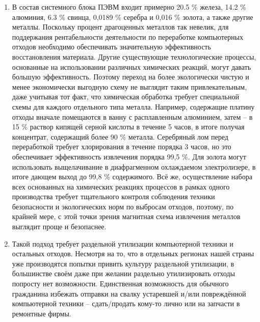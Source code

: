 \begin {enumerate}
	\item В состав системного блока ПЭВМ входит примерно 20.5 \% железа, 14.2 \% алюминия, 6.3 \% свинца, 0,0189 \% серебра и 0,016 \% золота, а также другие металлы. Поскольку процент драгоценных металлов так невелик, для поддержания рентабельности деятельности по переработке компьютерных отходов необходимо обеспечивать значительную эффективность восстановления материала. Другие существующие технологические процессы, основанные на использовании различных химических реакций, могут давать большую эффективность. Поэтому переход на более экологически чистую и менее экономически выгодную схему не выглядит таким привлекательным, даже учитывая тот факт, что химическая обработка требует специальной схемы для каждого отдельного типа металла. Например, содержащие платину отходы вначале помещаются в ванну с расплавленным алюминием, затем – в 15 \% раствор кипящей серной кислоты в течение 5 часов, в итоге получая концентрат, содержащий более 90 \% металла. Серебряный лом перед переработкой требует хлорирования в течение порядка 3 часов, но это обеспечивает эффективность извлечения порядка 99,5 \%. Для золота могут использовать выщелачивание в диафрагменном охлаждаемом электролизере, в итоге дающем выход до 99,8 \% содержимого. Всё же, осуществление набора всех основанных на химических реакциях процессов в рамках одного производства требует тщательного контроля соблюдения техники безопасности и экологических норм по выбросам отходов, поэтому, по крайней мере, с этой точки зрения магнитная схема извлечения металлов выглядит проще и безопаснее.
	\item Такой подход требует раздельной утилизации компьютерной техники и остальных отходов. Несмотря на то, что в отдельных регионах нашей страны уже производятся попытки привить культуру раздельной утилизации, в большинстве своём даже при желании раздельно утилизировать отходы попросту нет возможности. Единственная возможность для обычного гражданина избежать отправки на свалку устаревшей и/или повреждённой компьютерной техники – сдать/продать кому-то лично или на запчасти в ремонтные фирмы.
\end {enumerate}
